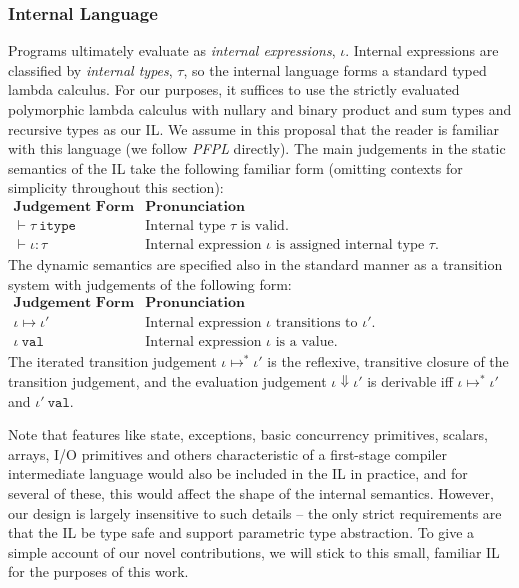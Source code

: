 \subsubsection{Internal Language}
Programs ultimately evaluate as \emph{internal expressions}, $\iota$. Internal expressions are classified by \emph{internal types}, $\tau$, so the internal language forms a standard typed lambda calculus. For our purposes, it suffices to use the strictly evaluated polymorphic lambda calculus with nullary and binary product and sum types and recursive types as our IL. We assume in this proposal that the reader is familiar with this language (we follow \emph{PFPL} \cite{pfpl} directly). The main judgements in the static semantics of the IL take the following familiar form (omitting contexts for simplicity throughout this section):
\\[1ex]
$
\begin{array}{ll}
\textbf{Judgement Form} & \textbf{Pronunciation}\\
\vdash \tau~\mathtt{itype} & \text{Internal type $\tau$ is valid.}\\
\vdash \iota : \tau & \text{Internal expression $\iota$ is assigned internal type $\tau$.}
\end{array}
$\\

\noindent
The dynamic semantics are specified also in the standard manner as a transition system with  judgements of the following form:
\\[1ex]
$
\begin{array}{ll}
\textbf{Judgement Form} & \textbf{Pronunciation}\\
\iota \mapsto \iota' & \text{Internal expression $\iota$ transitions to $\iota'$.}\\
\iota~\mathtt{val} & \text{Internal expression $\iota$ is a value.}
\end{array}
$
\\[1ex]
The iterated transition judgement $\iota \mapsto^{*} \iota'$ is the reflexive, transitive closure of the transition judgement, and the evaluation judgement $\iota \Downarrow \iota'$ is derivable iff $\iota \mapsto^{*} \iota'$ and $\iota'~\mathtt{val}$. 

Note that features like state, exceptions, basic concurrency primitives, scalars, arrays, I/O primitives and others characteristic of a first-stage compiler intermediate language would also be included in the IL in practice, and for several of these, this would affect the shape of the internal semantics. However, our design is largely insensitive to such details -- the only strict requirements are that the IL be type safe and support parametric type abstraction. To give a simple account of our novel contributions, we will stick to this small, familiar IL for the purposes of this work. %



